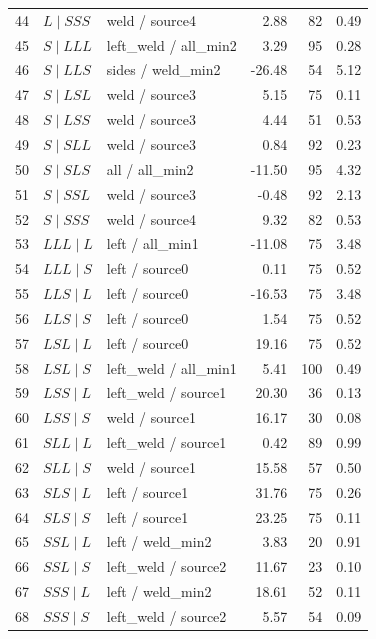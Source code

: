 \documentclass[11pt]{article}
\begin{document}
\begin{longtable}{@{}r>{\raggedright\arraybackslash}p{.28\linewidth}>{\raggedright\arraybackslash}p{.27\linewidth}rrr@{}}
44 & $L\mid SSS$ & weld / source4 & 2.88 & 82 & 0.49\\
45 & $S\mid LLL$ & left\_\allowbreak weld / all\_\allowbreak min2 & 3.29 & 95 & 0.28\\
46 & $S\mid LLS$ & sides / weld\_\allowbreak min2 & -26.48 & 54 & 5.12\\
47 & $S\mid LSL$ & weld / source3 & 5.15 & 75 & 0.11\\
48 & $S\mid LSS$ & weld / source3 & 4.44 & 51 & 0.53\\
49 & $S\mid SLL$ & weld / source3 & 0.84 & 92 & 0.23\\
50 & $S\mid SLS$ & all / all\_\allowbreak min2 & -11.50 & 95 & 4.32\\
51 & $S\mid SSL$ & weld / source3 & -0.48 & 92 & 2.13\\
52 & $S\mid SSS$ & weld / source4 & 9.32 & 82 & 0.53\\
53 & $LLL\mid L$ & left / all\_\allowbreak min1 & -11.08 & 75 & 3.48\\
54 & $LLL\mid S$ & left / source0 & 0.11 & 75 & 0.52\\
55 & $LLS\mid L$ & left / source0 & -16.53 & 75 & 3.48\\
56 & $LLS\mid S$ & left / source0 & 1.54 & 75 & 0.52\\
57 & $LSL\mid L$ & left / source0 & 19.16 & 75 & 0.52\\
58 & $LSL\mid S$ & left\_\allowbreak weld / all\_\allowbreak min1 & 5.41 & 100 & 0.49\\
59 & $LSS\mid L$ & left\_\allowbreak weld / source1 & 20.30 & 36 & 0.13\\
60 & $LSS\mid S$ & weld / source1 & 16.17 & 30 & 0.08\\
61 & $SLL\mid L$ & left\_\allowbreak weld / source1 & 0.42 & 89 & 0.99\\
62 & $SLL\mid S$ & weld / source1 & 15.58 & 57 & 0.50\\
63 & $SLS\mid L$ & left / source1 & 31.76 & 75 & 0.26\\
64 & $SLS\mid S$ & left / source1 & 23.25 & 75 & 0.11\\
65 & $SSL\mid L$ & left / weld\_\allowbreak min2 & 3.83 & 20 & 0.91\\
66 & $SSL\mid S$ & left\_\allowbreak weld / source2 & 11.67 & 23 & 0.10\\
67 & $SSS\mid L$ & left / weld\_\allowbreak min2 & 18.61 & 52 & 0.11\\
68 & $SSS\mid S$ & left\_\allowbreak weld / source2 & 5.57 & 54 & 0.09\\

\end{longtable}
\end{document}
